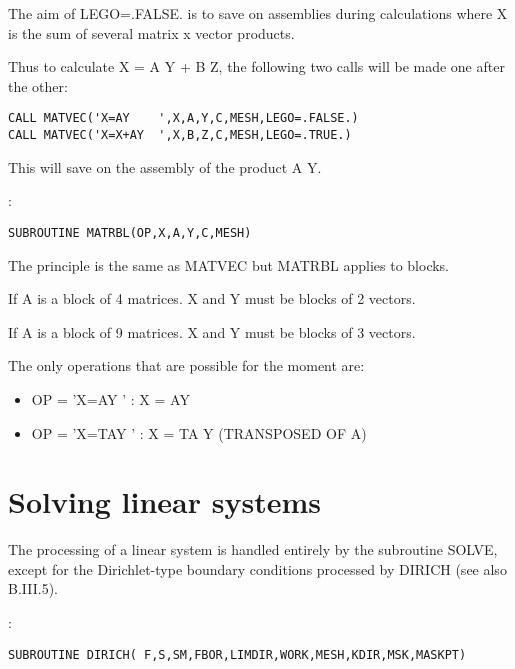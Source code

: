 The aim of LEGO=.FALSE. is to save on assemblies during calculations where X is
the sum of several matrix x vector products.

Thus to calculate X = A Y + B Z, the following two calls will be made one after
the other:

\begin{lstlisting}[language=TelFortran]
CALL MATVEC('X=AY    ',X,A,Y,C,MESH,LEGO=.FALSE.)
CALL MATVEC('X=X+AY  ',X,B,Z,C,MESH,LEGO=.TRUE.)
\end{lstlisting}

This will save on the assembly of the product A Y.

:
\begin{lstlisting}[language=TelFortran]
SUBROUTINE MATRBL(OP,X,A,Y,C,MESH)
\end{lstlisting}

The principle is the same as MATVEC but MATRBL applies to blocks.

If A is a block of 4 matrices. X and Y must be blocks of 2 vectors.

If A is a block of 9 matrices. X and Y must be blocks of 3 vectors.

The only operations that are possible for the moment are:
\begin{itemize}
  \item OP = 'X=AY    '  : X = AY
  \item OP = 'X=TAY   '  : X = TA Y (TRANSPOSED OF A)
\end{itemize}

\section{Solving linear systems}

The processing of a linear system is handled entirely by the subroutine SOLVE,
except for the Dirichlet-type boundary conditions processed by DIRICH (see also
B.III.5).

:
\begin{lstlisting}[language=TelFortran]
SUBROUTINE DIRICH( F,S,SM,FBOR,LIMDIR,WORK,MESH,KDIR,MSK,MASKPT)
\end{lstlisting}

